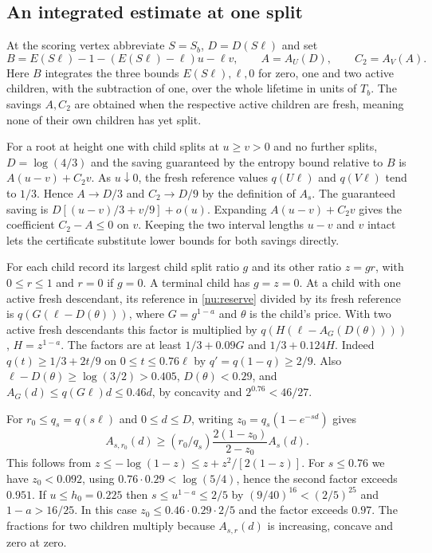 \documentclass[11pt]{article}
\numberwithin{equation}{section}
\begin{document}
\subsection{An integrated estimate at one split}

At the scoring vertex abbreviate $S=S_b$, $D=D(S\ell)$ and set
\[
 B=E(S\ell)-1-(E(S\ell)-\ell)u-\ell v,\qquad
 A=A_U(D),\qquad C_2=A_V(A).
\]
Here $B$ integrates the three bounds $E(S\ell),\ell,0$ for
zero, one and two active children, with the subtraction of one,
over the whole lifetime in units of $T_b$. The savings $A,C_2$
are obtained when the respective active children are fresh,
meaning none of their own children has yet split.

For a root at height one with child splits at $u\ge v>0$ and no
further splits, $D=\log(4/3)$ and the saving guaranteed by the
entropy bound relative to $B$ is $A(u-v)+C_2v$. As $u\downarrow0$,
the fresh reference values $q(U\ell)$ and $q(V\ell)$ tend to
$1/3$. Hence $A\to D/3$ and $C_2\to D/9$ by the definition of
$A_s$. The guaranteed saving is $D[(u-v)/3+v/9]+o(u)$.
Expanding $A(u-v)+C_2v$ gives the
coefficient $C_2-A\le0$ on $v$. Keeping the two interval lengths
$u-v$ and $v$ intact lets the certificate substitute lower bounds
for both savings directly.

For each child record its largest child split ratio $g$ and its
other ratio $z=gr$, with $0\le r\le1$ and $r=0$ if $g=0$.
A terminal child has $g=z=0$.
At a child with one active fresh descendant, its reference in
\eqref{nu:reserve} divided by its fresh reference is
$q(G(\ell-D(\theta)))$, where $G=g^{1-a}$ and $\theta$ is the
child's price. With two active fresh descendants this factor is
multiplied by $q(H(\ell-A_G(D(\theta))))$, $H=z^{1-a}$.
The factors are at least $1/3+0.09G$ and $1/3+0.124H$.
Indeed $q(t)\ge1/3+2t/9$ on $0\le t\le0.76\ell$ by
$q'=q(1-q)\ge2/9$. Also $\ell-D(\theta)\ge\log(3/2)>0.405$,
$D(\theta)<0.29$, and $A_G(d)\le q(G\ell)d\le0.46d$,
by concavity and $2^{0.76}<46/27$.

For $r_0\le q_s=q(s\ell)$ and $0\le d\le D$, writing
$z_0=q_s(1-e^{-sd})$ gives
\[
 A_{s,r_0}(d)\ge (r_0/q_s)\frac{2(1-z_0)}{2-z_0} A_s(d).
\]
This follows from $z\le-\log(1-z)\le z+z^2/[2(1-z)]$.
For $s\le0.76$ we have $z_0<0.092$, using
$0.76\cdot0.29<\log(5/4)$, hence the second factor exceeds
$0.951$. If $u\le h_0=0.225$ then $s\le u^{1-a}\le2/5$
by $(9/40)^{16}<(2/5)^{25}$ and $1-a>16/25$. In this case
$z_0\le0.46\cdot0.29\cdot2/5$ and the factor exceeds $0.97$.
The fractions for two children multiply because $A_{s,r}(d)$
is increasing, concave and zero at zero.
\end{document}
